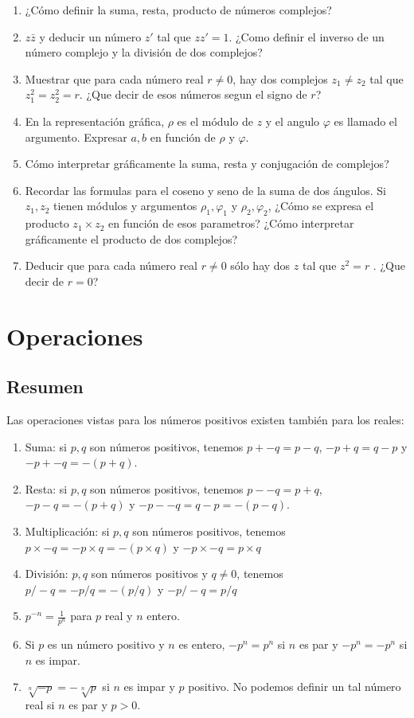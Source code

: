 \begin{enumerate}
\item ¿Cómo definir la suma, resta, producto de números complejos?
\item  $z \bar{z}$ y deducir un número $z'$ tal que $z z' = 1$. ¿Como definir
  el inverso de un número complejo y la división de dos complejos?
\item Muestrar que para cada número real $r \neq 0$, hay dos complejos
  $z_1 \neq z_2$ tal que $z_1^2 = z_2^2 = r$. ¿Que decir de esos números segun
  el signo de $r$?
\item En la representación gráfica, $\rho$ es el módulo de $z$ y el angulo
  $\varphi$ es llamado el argumento. Expresar $a, b$
  en función de $\rho$ y $\varphi$.
\item Cómo interpretar gráficamente la suma, resta y conjugación de complejos?
\item Recordar las formulas para el coseno y seno de la suma de dos ángulos.
  Si $z_1, z_2$ tienen módulos y argumentos $\rho_1, \varphi_1$ y
  $\rho_2, \varphi_2$, ¿Cómo se expresa el producto $z_1 \times z_2$ en función
  de esos parametros? ¿Cómo interpretar gráficamente el producto de dos
  complejos?
\item Deducir que para cada número real $r \neq 0$ sólo hay dos $z$ tal
  que $z^2 = r$ . ¿Que decir de $r=0$?
\end{enumerate}

\section{Operaciones}

\subsection*{Resumen}

Las operaciones vistas para los números positivos existen también para
los reales:

\begin{enumerate}
\item Suma: si $p, q$ son números positivos, tenemos
  $p + -q = p - q$, $-p + q = q - p$ y $-p + -q = -{(p+q)}$.
\item Resta: si $p, q$ son números positivos, tenemos
  $p - -q = p + q$, $-p - q = -{(p + q)}$ y $-p - -q = q - p = -{(p - q)}$.
\item Multiplicación: si $p, q$ son números positivos, tenemos
  $p \times -q = -p \times q = -{(p \times q)}$ y
  $-p \times -q = p \times q$
\item División: $p, q$ son números positivos y $q \neq 0$, tenemos
  $p / -q = -p / q = -{(p / q)}$ y
  $-p / -q = p / q$
\item $p^{-n} = \frac{1}{p^n}$ para $p$ real y $n$ entero.
\item Si $p$ es un número positivo y $n$ es entero,
  ${-p}^{n} = p^n$ si $n$ es par y ${-p}^{n} = -p^n$ si $n$ es impar.
\item $\sqrt[n]{-p} = -\sqrt[n]{p}$ si $n$ es impar y $p$ positivo. No podemos
  definir un tal número real si $n$ es par y $p > 0$.
\end{enumerate}

